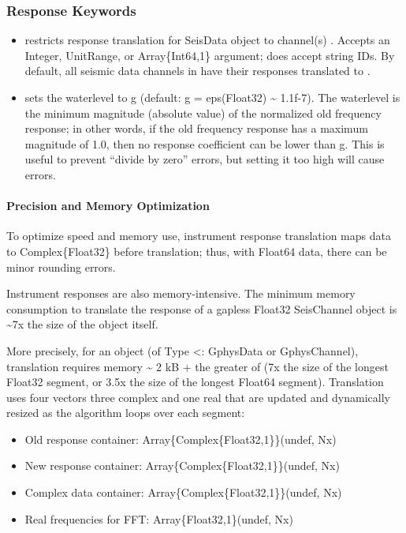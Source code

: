 \documentclass[letterpaper,11pt,english]{sphinxmanual}
\begin{document}
\subsubsection{Response Keywords}
\label{\detokenize{src/Processing/processing:response-keywords}}\begin{itemize}
\item {} 
 restricts response translation for SeisData object  to channel(s) . Accepts an Integer, UnitRange, or Array\{Int64,1\} argument; does  accept string IDs. By default, all seismic data channels in  have their responses translated to .

\item {} 
 sets the waterlevel to g (default: g = eps(Float32) \textasciitilde{} 1.1f-7). The waterlevel is the minimum magnitude (absolute value) of the normalized old frequency response; in other words, if the old frequency response has a maximum magnitude of 1.0, then no response coefficient can be lower than g. This is useful to prevent “divide by zero” errors, but setting it too high will cause errors.

\end{itemize}


\paragraph{Precision and Memory Optimization}
\label{\detokenize{src/Processing/processing:precision-and-memory-optimization}}
To optimize speed and memory use, instrument response translation maps data to
Complex\{Float32\} before translation; thus, with Float64 data, there can be
minor rounding errors.

Instrument responses are also memory-intensive. The minimum memory consumption
to translate the response of a gapless Float32 SeisChannel object is \textasciitilde{}7x the
size of the object itself.

More precisely, for an object  (of Type \textless{}: GphysData or GphysChannel),
translation requires memory \textasciitilde{} 2 kB + the greater of (7x the size of the longest
Float32 segment, or 3.5x the size of the longest Float64 segment). Translation
uses four vectors \textendash{} three complex and one real \textendash{} that are updated and
dynamically resized as the algorithm loops over each segment:
\begin{itemize}
\item {} 
Old response container: Array\{Complex\{Float32,1\}\}(undef, Nx)

\item {} 
New response container: Array\{Complex\{Float32,1\}\}(undef, Nx)

\item {} 
Complex data container: Array\{Complex\{Float32,1\}\}(undef, Nx)

\item {} 
Real frequencies for FFT: Array\{Float32,1\}(undef, Nx)

\end{itemize}
\end{document}
